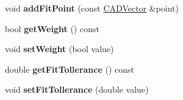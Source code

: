 \begin{DoxyCompactItemize}
\item 
void {\bfseries add\+Fit\+Point} (const \hyperlink{class_c_a_d_vector}{C\+A\+D\+Vector} \&point)\hypertarget{class_c_a_d_spline_a4d929d9ec79c818b72516ad232827991}{}\label{class_c_a_d_spline_a4d929d9ec79c818b72516ad232827991}

\item 
bool {\bfseries get\+Weight} () const \hypertarget{class_c_a_d_spline_a1b561646de65c97e29f5a5fbae4052bf}{}\label{class_c_a_d_spline_a1b561646de65c97e29f5a5fbae4052bf}

\item 
void {\bfseries set\+Weight} (bool value)\hypertarget{class_c_a_d_spline_a408e781dd2104cb1da4287660656dccd}{}\label{class_c_a_d_spline_a408e781dd2104cb1da4287660656dccd}

\item 
double {\bfseries get\+Fit\+Tollerance} () const \hypertarget{class_c_a_d_spline_a04c0d0eb3c8032c8aea061b03c5bce5f}{}\label{class_c_a_d_spline_a04c0d0eb3c8032c8aea061b03c5bce5f}

\item 
void {\bfseries set\+Fit\+Tollerance} (double value)\hypertarget{class_c_a_d_spline_a640de57f962e7079637024bb91151467}{}\label{class_c_a_d_spline_a640de57f962e7079637024bb91151467}

\end{DoxyCompactItemize}
